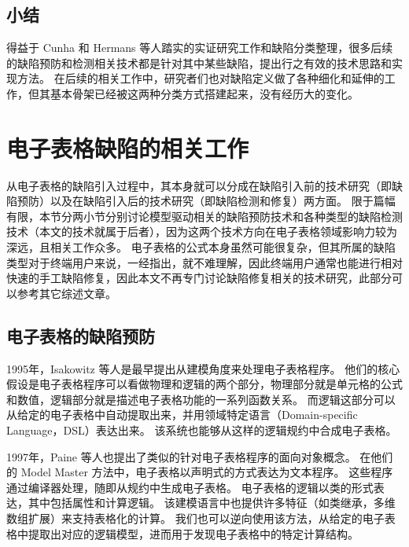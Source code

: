 \subsection{小结}
得益于 Cunha 和 Hermans 等人踏实的实证研究工作和缺陷分类整理\cite{cunha2012towards,hermans2012detecting2,jansen2015code}，很多后续的缺陷预防和检测相关技术都是针对其中某些缺陷，提出行之有效的技术思路和实现方法。
在后续的相关工作中，研究者们也对缺陷定义做了各种细化和延伸的工作，但其基本骨架已经被这两种分类方式搭建起来，没有经历大的变化。


\section{电子表格缺陷的相关工作}
从电子表格的缺陷引入过程中，其本身就可以分成在缺陷引入前的技术研究（即缺陷预防）以及在缺陷引入后的技术研究（即缺陷检测和修复）两方面。
限于篇幅有限，本节分两小节分别讨论模型驱动相关的缺陷预防技术和各种类型的缺陷检测技术（本文的技术就属于后者），因为这两个技术方向在电子表格领域影响力较为深远，且相关工作众多。
电子表格的公式本身虽然可能很复杂，但其所属的缺陷类型对于终端用户来说，一经指出，就不难理解，因此终端用户通常也能进行相对快速的手工缺陷修复，因此本文不再专门讨论缺陷修复相关的技术研究，此部分可以参考其它综述文章\cite{jannach2014avoiding}。

\subsection{电子表格的缺陷预防}
1995年，Isakowitz 等人\cite{isakowitz1995toward}是最早提出从建模角度来处理电子表格程序。
他们的核心假设是电子表格程序可以看做物理和逻辑的两个部分，物理部分就是单元格的公式和数值，逻辑部分就是描述电子表格功能的一系列函数关系。
而逻辑这部分可以从给定的电子表格中自动提取出来，并用领域特定语言（Domain-specific Language，DSL）表达出来。
该系统也能够从这样的逻辑规约中合成电子表格。

1997年，Paine 等人\cite{ireson1997model,paine2008ensuring,paine2005bringing,paine2008rapid}也提出了类似的针对电子表格程序的面向对象概念。
在他们的 Model Master 方法中，电子表格以声明式的方式表达为文本程序。
这些程序通过编译器处理，随即从规约中生成电子表格。
电子表格的逻辑以类的形式表达，其中包括属性和计算逻辑。
该建模语言中也提供许多特征（如类继承，多维数组扩展）来支持表格化的计算。
我们也可以逆向使用该方法，从给定的电子表格中提取出对应的逻辑模型，进而用于发现电子表格中的特定计算结构\cite{paine2008spreadsheet}。


